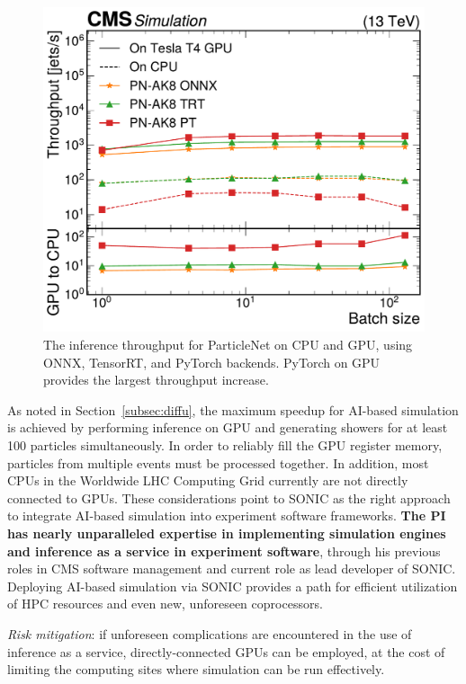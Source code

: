 \begin{figure}
\centering
\includegraphics[width=0.49\myfigurewidth]{figures/CMS-MLG-23-001_Figure_005-b.pdf}
\caption{The inference throughput for ParticleNet on CPU and GPU, using ONNX, TensorRT, and PyTorch backends. PyTorch on GPU provides the largest throughput increase.}
\label{fig:sonic}
\end{figure}

As noted in Section~\ref{subsec:diffu}, the maximum speedup for AI-based simulation is achieved by performing inference on GPU
and generating showers for at least 100 particles simultaneously.
In order to reliably fill the GPU register memory, particles from multiple events must be processed together.
In addition, most CPUs in the Worldwide LHC Computing Grid currently are not directly connected to GPUs.
These considerations point to SONIC as the right approach to integrate AI-based simulation into experiment software frameworks.
\textbf{The PI has nearly unparalleled expertise in implementing simulation engines and inference as a service in experiment software},
through his previous roles in CMS software management and current role as lead developer of SONIC.
Deploying AI-based simulation via SONIC provides a path for efficient utilization of HPC resources and even new, unforeseen coprocessors.

\textit{Risk mitigation}: if unforeseen complications are encountered in the use of inference as a service,
directly-connected GPUs can be employed, at the cost of limiting the computing sites where simulation can be run effectively.

